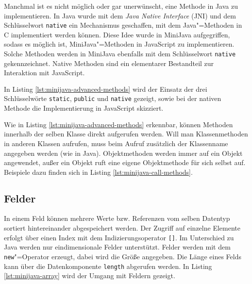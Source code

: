 Manchmal ist es nicht möglich oder gar unerwünscht, eine Methode in Java zu implementieren. In Java wurde mit dem \emph{Java Native Interface} (JNI) \cite{JNI8} und dem Schlüsselwort \lstinline{native} ein Mechanismus geschaffen, mit dem Java"=Methoden in C implementiert werden können. Diese Idee wurde in MiniJava aufgegriffen, sodass es möglich ist, MiniJava"=Methoden in JavaScript zu implementieren. Solche Methoden werden in MiniJava ebenfalls mit dem Schlüsselwort \lstinline{native} gekennzeichnet. Native Methoden sind ein elementarer Bestandteil zur Interaktion mit JavaScript.

In Listing \ref{lst:minijava-advanced-methods} wird der Einsatz der drei Schlüsselwörte \lstinline{static}, \lstinline{public} und \lstinline{native} gezeigt, sowie bei der nativen Methode die Implementierung in JavaScript skizziert.



Wie in Listing \ref{lst:minijava-advanced-methods} erkennbar, können Methoden innerhalb der selben Klasse direkt aufgerufen werden. Will man Klassenmethoden in anderen Klassen aufrufen, muss beim Aufruf zusätzlich der Klassenname angegeben werden (wie in Java). Objektmethoden werden immer auf ein Objekt angewendet, außer ein Objekt ruft eine eigene Objektmethode für sich selbst auf. Beispiele dazu finden sich in Listing \ref{lst:minijava-call-methods}.



\subsection{Felder}
\label{subsec:MiniJava-Felder}

In einem Feld können mehrere Werte bzw. Referenzen vom selben Datentyp sortiert hintereinander abgespeichert werden. Der Zugriff auf einzelne Elemente erfolgt über einen Index mit dem Indizierungsoperator \lstinline{[]}. Im Unterschied zu Java werden nur eindimensionale Felder unterstützt. Felder werden mit dem \lstinline{new}"=Operator erzeugt, dabei wird die Größe angegeben. Die Länge eines Felds kann über die Datenkomponente \lstinline{length} abgerufen werden. In Listing \ref{lst:minijava-array} wird der Umgang mit Feldern gezeigt.

